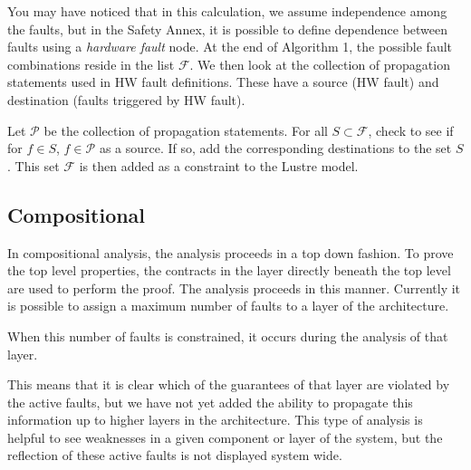 You may have noticed that in this calculation, we assume independence among the faults, but in the Safety Annex, it is possible to define dependence between faults using a \textit{hardware fault} node. At the end of Algorithm 1, the possible fault combinations reside in the list $\mathcal{F}$. We then look at the collection of propagation statements used in HW fault definitions. These have a source (HW fault) and destination (faults triggered by HW fault). 

Let $\mathcal{P}$ be the collection of propagation statements. For all $S \subset \mathcal{F}$, check to see if for $f \in S$, $f \in \mathcal{P}$ as a source. If so, add the corresponding destinations to the set $S$. This set $\mathcal{F}$ is then added as a constraint to the Lustre model. 


\subsection{Compositional}
In compositional analysis, the analysis proceeds in a top down fashion. To prove the top level properties, the contracts in the layer directly beneath the top level are used to perform the proof. The analysis proceeds in this manner. Currently it is possible to assign a maximum number of faults to a layer of the architecture. 

When this number of faults is constrained, it occurs during the analysis of that layer.

 This means that it is clear which of the guarantees of that layer are violated by the active faults, but we have not yet added the ability to propagate this information up to higher layers in the architecture. This type of analysis is helpful to see weaknesses in a given component or layer of the system, but the reflection of these active faults is not displayed system wide.


